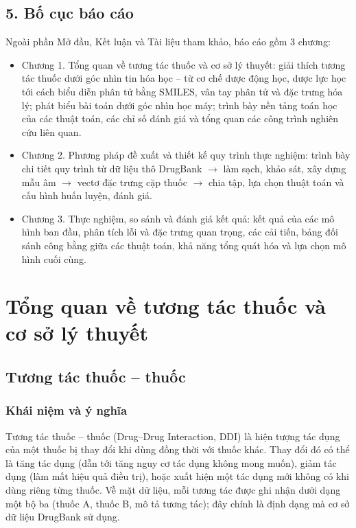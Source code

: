 \documentclass[12pt,a4paper,oneside]{report}
\begin{document}
\section*{5. Bố cục báo cáo}
Ngoài phần Mở đầu, Kết luận và Tài liệu tham khảo, báo cáo gồm
3 chương:
\begin{itemize}
  \item Chương 1. Tổng quan về tương tác thuốc và cơ sở lý thuyết:
        giải thích tương tác thuốc dưới góc nhìn tin hóa học -- từ cơ chế dược
        động học, dược lực học tới cách biểu diễn phân tử bằng SMILES, vân tay
        phân tử và đặc trưng hóa lý; phát biểu bài toán dưới góc nhìn học máy;
        trình bày nền tảng toán học của các thuật toán, các chỉ số đánh giá và
        tổng quan các công trình nghiên cứu liên quan.
  \item Chương 2. Phương pháp đề xuất và thiết kế quy trình thực
        nghiệm: trình bày chi tiết quy trình từ dữ liệu thô DrugBank
        $\rightarrow$ làm sạch, khảo sát, xây dựng mẫu âm $\rightarrow$ vectơ
        đặc trưng cặp thuốc $\rightarrow$ chia tập, lựa chọn thuật toán và cấu
        hình huấn luyện, đánh giá.
  \item Chương 3. Thực nghiệm, so sánh và đánh giá kết quả: kết quả
        của các mô hình ban đầu, phân tích lỗi và đặc trưng quan trọng, các cải
        tiến, bảng đối sánh công bằng giữa các thuật toán, khả năng tổng quát
        hóa và lựa chọn mô hình cuối cùng.
\end{itemize}

\chapter{Tổng quan về tương tác thuốc và cơ sở lý thuyết}
\label{chap:tongquan}

\section{Tương tác thuốc -- thuốc}
\label{sec:ddi}

\subsection{Khái niệm và ý nghĩa}
Tương tác thuốc -- thuốc (Drug--Drug Interaction, DDI) là hiện tượng
tác dụng của một thuốc bị thay đổi khi dùng đồng thời với thuốc khác. Thay đổi
đó có thể là tăng tác dụng (dẫn tới tăng nguy cơ tác dụng không mong muốn),
giảm tác dụng (làm mất hiệu quả điều trị), hoặc xuất hiện một tác dụng mới
không có khi dùng riêng từng thuốc. Về mặt dữ liệu, mỗi tương tác được ghi
nhận dưới dạng một bộ ba (thuốc A, thuốc B, mô tả tương tác); đây chính
là định dạng mà cơ sở dữ liệu DrugBank \cite{wishart2018} sử dụng.
\end{document}
